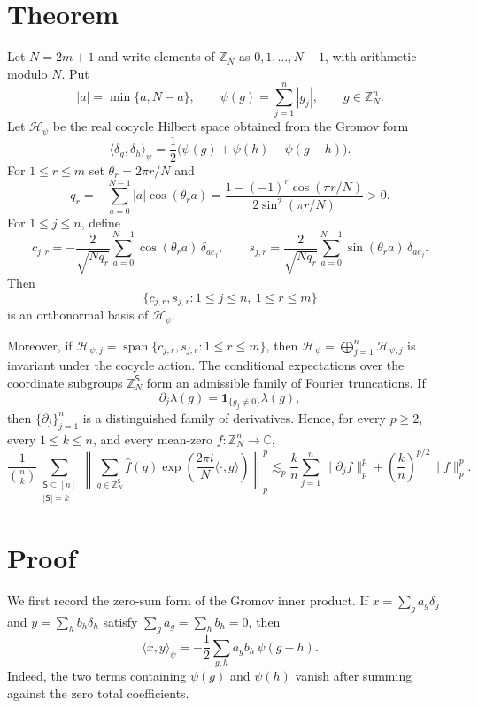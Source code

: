 \documentclass[11pt]{article}
\newcommand{\Z}{\mathbb Z}
\newcommand{\C}{\mathbb C}
\newcommand{\Hcal}{\mathcal H}
\newcommand{\Ss}{\mathsf S}
\newcommand{\one}{\mathbf 1}
\DeclareMathOperator{\spanop}{span}
\begin{document}
\section*{Theorem}

Let $N=2m+1$ and write elements of $\Z_N$ as $0,1,\ldots,N-1$, with arithmetic
modulo $N$.  Put
\[
  |a|=\min\{a,N-a\},\qquad
  \psi(g)=\sum_{j=1}^n |g_j|,\qquad g\in \Z_N^n.
\]
Let $\Hcal_\psi$ be the real cocycle Hilbert space obtained from the Gromov
form
\[
  \langle \delta_g,\delta_h\rangle_\psi
  =\frac{1}{2}\bigl(\psi(g)+\psi(h)-\psi(g-h)\bigr).
\]
For $1\le r\le m$ set $\theta_r=2\pi r/N$ and
\[
  q_r
  =-\sum_{a=0}^{N-1}|a|\cos(\theta_r a)
  =\frac{1-(-1)^r\cos(\pi r/N)}{2\sin^2(\pi r/N)}  >0 .
\]
For $1\le j\le n$, define
\[
  c_{j,r}=-\frac{2}{\sqrt{Nq_r}}\sum_{a=0}^{N-1}
       \cos(\theta_r a)\,\delta_{ae_j},
  \qquad
  s_{j,r}= \frac{2}{\sqrt{Nq_r}}\sum_{a=0}^{N-1}
       \sin(\theta_r a)\,\delta_{ae_j}.
\]
Then
\[
  \bigl\{c_{j,r},s_{j,r}: 1\le j\le n,\ 1\le r\le m\bigr\}
\]
is an orthonormal basis of $\Hcal_\psi$.

Moreover, if $\Hcal_{\psi,j}=\spanop\{c_{j,r},s_{j,r}:1\le r\le m\}$, then
$\Hcal_\psi=\bigoplus_{j=1}^n\Hcal_{\psi,j}$ is invariant under the cocycle
action.  The conditional expectations over the coordinate subgroups
$\Z_N^\Ss$ form an admissible family of Fourier truncations.  If
\[
  \partial_j\lambda(g)=\one_{\{g_j\ne0\}}\lambda(g),
\]
then $\{\partial_j\}_{j=1}^n$ is a distinguished family of derivatives.  Hence,
for every $p\ge2$, every $1\le k\le n$, and every mean-zero
$f:\Z_N^n\to\C$,
\[
 \frac{1}{\binom{n}{k}}\sum_{\substack{\Ss\subseteq[n]\\|\Ss|=k}}
 \left\|\sum_{g\in\Z_N^\Ss}\widehat f(g)
       \exp\left(\frac{2\pi i}{N}\langle\cdot,g\rangle\right)\right\|_p^p
 \lesssim_p
 \frac{k}{n}\sum_{j=1}^n \|\partial_j f\|_p^p
 +\left(\frac{k}{n}\right)^{p/2}\|f\|_p^p .
\]

\section*{Proof}

We first record the zero-sum form of the Gromov inner product.  If
$x=\sum_g a_g\delta_g$ and $y=\sum_h b_h\delta_h$ satisfy
$\sum_g a_g=\sum_h b_h=0$, then
\begin{equation}\label{eq:zero-sum}
  \langle x,y\rangle_\psi
  =-\frac{1}{2}\sum_{g,h}a_gb_h\,\psi(g-h).
\end{equation}
Indeed, the two terms containing $\psi(g)$ and $\psi(h)$ vanish after summing
against the zero total coefficients.
\end{document}
